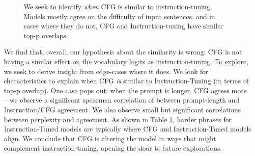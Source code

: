 \documentclass{article}
\begin{document}
\begin{figure}
\centering
{}\hspace{2em}
\caption{We seek to identify \textit{when} CFG is similar to instruction-tuning. Models mostly agree on the difficulty of input sentences, and in cases where they do not, CFG and Instruction-tuning have similar top-p overlaps.}
\label{tbl:ppls_of_diff_models}
\end{figure}

We find that, overall, our hypothesis about the similarity is wrong: CFG is not having a similar effect on the vocabulary logits as instruction-tuning. To explore, we seek to derive insight from edge-cases where it does. We look for characteristics to explain when CFG \textit{is} similar to Instruction-Tuning (in terms of top-p overlap). One case pops out: when the prompt is longer, CFG agrees more -- we observe a significant spearman correlation of  between prompt-length and Instruction/CFG agreement. We also observe small but significant correlations between perplexity and agreement. As shown in Table \ref{tbl:ppls_of_diff_models}, harder phrases for Instruction-Tuned models are typically where CFG and Instruction-Tuned models align. We conclude that CFG is altering the model in ways that might complement instruction-tuning, opening the door to future explorations.
\end{document}
